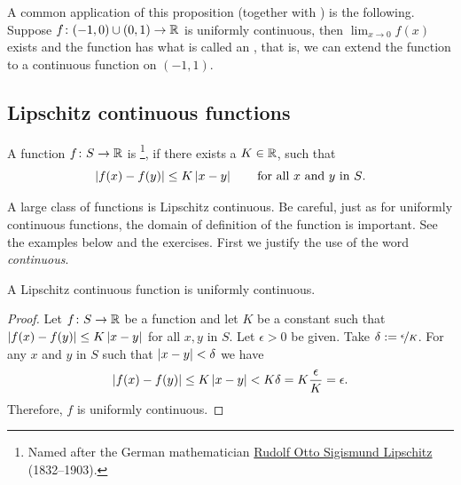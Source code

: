 A common application of this proposition (together with
)
is the following.
Suppose $f \colon (-1,0) \cup (0,1) \to {\mathbb{R}}$ is uniformly continuous,
then $\lim_{x\to 0} f(x)$ exists and the function
has what is called an \emph{}, that is,
we can extend the function to a continuous function on $(-1,1)$.


\subsection{Lipschitz continuous functions}

\begin{defn}
A function $f \colon S \to {\mathbb{R}}$
is \emph{}%
\footnote{Named after the German mathematician
\href{http://en.wikipedia.org/wiki/Rudolf_Lipschitz}{Rudolf Otto Sigismund Lipschitz}
(1832--1903).}, if there exists a $K \in {\mathbb{R}}$, such that
\begin{equation*}
\left\lvert {f(x)-f(y)} \right\rvert \leq K \left\lvert {x-y} \right\rvert 
\qquad \text{for all $x$ and $y$ in $S$.}
\end{equation*}
\end{defn}

A large class of functions is Lipschitz continuous.  Be careful, just as
for uniformly continuous functions, the
domain of definition of the function is important.  See the examples below
and the exercises.  First we justify the use of the word \emph{continuous}.

\begin{prop}
A Lipschitz continuous function is uniformly continuous.
\end{prop}

\begin{proof}
Let $f \colon S \to {\mathbb{R}}$ be a function and let $K$ be a constant such that
$\left\lvert {f(x)-f(y)} \right\rvert \leq K \left\lvert {x-y} \right\rvert$
for all $x, y$ in $S$.
Let $\epsilon > 0$ be given.  Take $\delta :=
\nicefrac{\epsilon}{K}$.
For any $x$ and $y$ in $S$ such that
$\left\lvert {x-y} \right\rvert < \delta$
we have 
\begin{equation*}
\left\lvert {f(x)-f(y)} \right\rvert \leq K \left\lvert {x-y} \right\rvert < K \delta = K \frac{\epsilon}{K} =
\epsilon .
\end{equation*}
Therefore, $f$ is uniformly continuous.
\end{proof}

